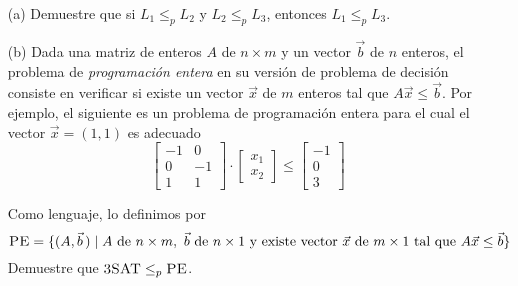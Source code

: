 \begin{enumerate}
    \item[(a)] Demuestre que si $L_1\leq_p L_2$ y $L_2\leq_p L_3$, entonces $L_1\leq_p L_3$.
    \item[(b)]  Dada una matriz de enteros $A$ de $n\times m$ y un vector $\vec{b}$ de $n$ enteros, el problema de \textit{programación entera} en su versión de problema de decisión consiste en verificar si existe un vector $\vec{x}$ de $m$ enteros tal que $A\vec{x}\leq \vec{b}$. Por ejemplo, el siguiente es un problema de programación entera para el cual el vector $\vec{x}=(1,1)$ es adecuado
    $$
    \begin{bmatrix}
        -1 & 0\\
        0 & -1\\
        1 & 1
        \end{bmatrix}
        \cdot
    \begin{bmatrix}
        x_1\\
        x_2
        \end{bmatrix}
        \leq
    \begin{bmatrix}
        -1\\
        0\\
        3
        \end{bmatrix}
    $$
    
    Como lenguaje, lo definimos por 
    $$\textsc{PE}=\{(A,\vec{b}\,)\mid A\text{ de }n\times m,\ \vec{b}\text{ de }n\times 1\text{ y existe vector }\vec{x}\text{ de }m\times 1\text{  tal que }A\vec{x}\leq \vec{b}\}$$
    Demuestre que $\textsc{3SAT}\leq_p \textsc{PE}$.

\end{enumerate}